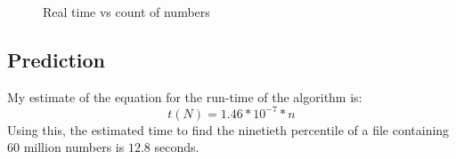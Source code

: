 \documentclass{article}
\begin{document}
 \begin{figure}
   \centering
  
   \caption{Real time vs count of numbers}
   \label{fig:experiment1}
 \end{figure}


\subsection{Prediction}
\label{sec:prediction2}

My estimate of the equation for the run-time of the algorithm is:
\begin{equation}
  \label{eq:estimated_runtime2}
  t(N) = 1.46*10^{-7} * n
\end{equation}
Using this, the estimated time to find the ninetieth percentile of a
file containing 60 million numbers is $12.8$ seconds.
\end{document}
